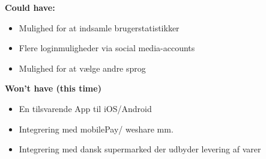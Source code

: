 \noindent \textbf{Could have:}

\begin{itemize}
    \item Mulighed for at indsamle brugerstatistikker
    \item Flere loginmuligheder via social media-accounts
    \item Mulighed for at vælge andre sprog
\end{itemize}

\noindent \textbf{Won't have (this time)}
\begin{itemize}
    \item En tilsvarende App til iOS/Android
    \item Integrering med mobilePay/ weshare mm.
    \item Integrering med dansk supermarked der udbyder levering af varer
\end{itemize}

